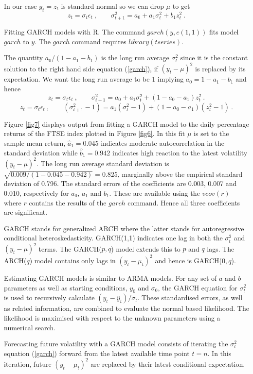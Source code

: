 \documentclass[authoryear]{elsarticle}
\newcommand{\eps}{\epsilon}
\newcommand{\eref}[1]{(\ref{#1})}
\newcommand{\fref}[1]{Figure \ref{#1}}
\newcommand{\cq}{\ , \qquad}
\begin{document}
In our case $y_t=z_t$ is standard normal so we can drop $\mu$ to get
$$
z_t=  \sigma_t\eps_t\cq \sigma^2_{t+1} = a_0+a_1 \sigma^2_{t} + b_1z_t^2\ .
$$ 


Fitting GARCH models with R.  The  command $garch(y,c(1,1))$ fits  model $garch$ to $y$.  The $garch$ command requires $library(tseries)$. 

The quantity $a_0/(1-a_1-b_1)$ is the long run average $\sigma^2_t$ since it is the constant solution to the right hand side equation \eref{garch}, if  $(y_t-\mu)^2$ is replaced by its expectation.    We want the long run average to be 1 implying
$
a_0=1-a_1-b_1
$ and hence
$$
z_t=  \sigma_t\eps_t\cq \sigma^2_{t+1} = a_0+a_1 \sigma^2_{t} + (1-a_0-a_1)z_t^2\ .
$$
$$
z_t=  \sigma_t\eps_t\cq (\sigma^2_{t+1}-1) = a_1 (\sigma^2_{t}-1) + (1-a_0-a_1)(z_t^2-1)\ .
$$



 \fref{fig7} displays output from fitting a GARCH model to the daily percentage returns of the FTSE index plotted in \fref{fig6}.   In this fit  $\mu$ is set to the sample mean return, $\hat a_1=0.045$ indicates moderate autocorrelation in the standard deviation while $\hat b_1= 0.942$ indicates high reaction to the latest volatility $(y_t-\mu)^2$.  The long run average standard deviation is $\sqrt{0.009/(1-0.045-0.942)}=0.825$, marginally above the empirical standard deviation of 0.796.   The  standard errors of the coefficients are 0.003, 0.007 and 0.010, respectively for $a_0$, $a_1$ and $b_1$.  These are available using the $vcov(r)$ where $r$ contains the results of the $garch$ command.  Hence all three coefficients are significant.

GARCH stands for generalized ARCH where the latter stands for autoregressive conditional heteroskedasticity.    GARCH(1,1) indicates one lag in both the $\sigma_t^2$ and $(y_t-\mu)^2$ terms.   The GARCH($p,q$) model extends this to $p$ and $q$ lags.   The  ARCH($q$) model contains only lags in $(y_{t}-\mu_t)^2$  and hence is GARCH($0,q$).   
    
Estimating GARCH models is similar to ARMA models.   For any set of $a$ and $b$ parameters as well as starting conditions,  $y_0$ and $\sigma_0$,   the GARCH equation for $\sigma_t^2$  is used to recursively calculate $(y_t-\hat y_{t})/\sigma_t$.  These standardised errors, as well as related information,  are combined to evaluate the normal based likelihood.   The likelihood is maximised  with respect to the unknown parameters using a numerical search. 

Forecasting future volatility with  a GARCH model consists of iterating the $\sigma_t^2$ equation \eref{garch} forward from the latest available time point $t=n$.    In this iteration, future $(y_t-\mu_t)^2$ are replaced by their latest conditional expectation. 
\end{document}
